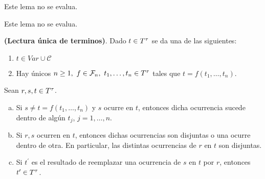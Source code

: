   \begin{lemma}
    \PN Este lema no se evalua.
  \end{lemma}

  \begin{lemma}
    \PN Este lema no se evalua.
  \end{lemma}

  \begin{theorem} \label{lemma_34}
    \PN \textbf{(Lectura única de terminos)}. Dado $t \in T^{\tau}$ se da una de las siguientes:
    \begin{enumerate}[(1)]
      \item $t \in Var \cup \mathcal{C}$
      \item Hay únicos $n \geq 1, \ f \in \mathcal{F}_{n}, \ t_{1}, \dotsc, t_{n} \in T^{\tau}$ tales que $t = f(t_{1},
        \dotsc, t_{n})$.
    \end{enumerate}
  \end{theorem}

  \begin{lemma} \label{lemma_35}
    \PN Sean $r, s, t \in T^{\tau}$.
    \begin{enumerate}[(a)]
      \item Si $s \neq t = f(t_{1}, \dotsc, t_{n})$ y $s$ ocurre en $t$, entonces dicha ocurrencia sucede dentro de
        algún $t_{j}$, $j = 1, \dotsc, n$.
      \item Si $r, s$ ocurren en $t$, entonces dichas ocurrencias son disjuntas o una ocurre dentro de otra. En
        particular, las distintas ocurrencias de $r$ en $t$ son disjuntas.
      \item Si $t^{\prime}$ es el resultado de reemplazar una ocurrencia de $s$ en $t$ por $r$, entonces $t^{\prime} \in
        T^{\tau}$.
    \end{enumerate}
  \end{lemma}

